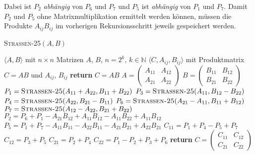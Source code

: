 \documentclass[oneside]{scrbook}
\numberwithin{equation}{section}
\begin{document}
Dabei ist $P_2$ \textit{abhängig} von $P_6$ und $P_7$ und $P_5$ ist \textit{abhängig} von $P_1$ und $P_7$. Damit $P_2$ und $P_5$ ohne Matrixmultiplikation ermittelt werden können, müssen die Produkte $A_{ij}B_{ij}$ im vorherigen Rekursionsschritt jeweils gespeichert werden.
\begin{algorithm}
	\caption{\textsc{Strassen-25}$(A, B)$}
	\label{alg:strassen25}
	\begin{algorithmic}[1]
		\Require $\langle A, B \rangle$ mit $n \times n$ Matrizen $A$, $B$, $n = 2^k$, $k \in \mathbb{N}$
		\Ensure $\langle C, A_{ij}, B_{ij} \rangle$ mit Produktmatrix $C = AB$ und $A_{ij}$, $B_{ij}$
		 \textbf{return} $C = AB$
		\EndIf
		\State $A = \begin{pmatrix} A_{11} & A_{12} \\ A_{21} & A_{22} \end{pmatrix}$
		\State $B = \begin{pmatrix} B_{11} & B_{12} \\ B_{21} & B_{22} \end{pmatrix}$
		\State $P_1 = \textsc{Strassen-25}(A_{11} + A_{22}, B_{11} + B_{22})$
		\State $P_3 = \textsc{Strassen-25}(A_{11}, B_{12} - B_{22})$
		\State $P_4 = \textsc{Strassen-25}(A_{22}, B_{21} - B_{11})$
		\State $P_6 = \textsc{Strassen-25}(A_{21} - A_{11}, B_{11} + B_{12})$
		\State $P_7 = \textsc{Strassen-25}(A_{12} - A_{22}, B_{21} + B_{22})$
		\State $P_2 = P_6 + P_1 - A_{21}B_{12} + A_{11}B_{12} - A_{11}B_{22} + A_{11}B_{12}$ 
		\State $P_5 = P_1 + P_7 - A_{11}B_{11} - A_{22}B_{11} - A_{21}B_{21} + A_{22}B_{21}$
		\State $C_{11} = P_1 + P_4 - P_5 + P_7$
		\State $C_{12} = P_3 + P_5$
		\State $C_{21} = P_2 + P_4$
		\State $C_{22} = P_1 - P_2 + P_3 + P_6$
		\State \textbf{return} $C = \begin{pmatrix} C_{11} & C_{12} \\ C_{21} & C_{22} \end{pmatrix}$
	\end{algorithmic}
\end{algorithm}
\end{document}
